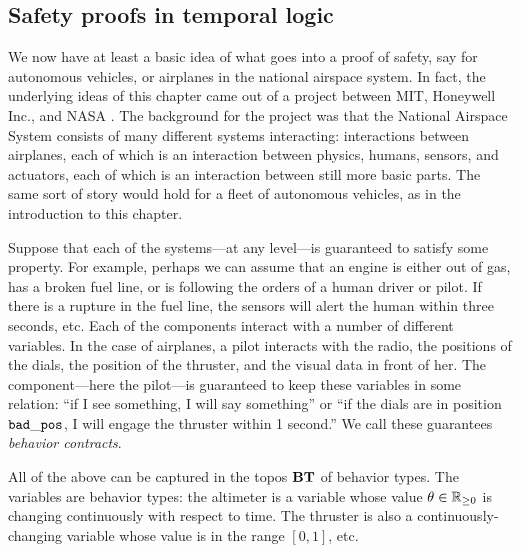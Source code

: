 \documentclass[7Sketches]{subfiles}
\begin{document}
%
%
%

%
\subsection{Safety proofs in temporal logic}%

We now have at least a basic idea of what goes into a proof of safety, say for
autonomous vehicles, or airplanes in the national airspace system. In fact, the underlying ideas of this chapter came out of a project between MIT, Honeywell Inc., and NASA \cite{speranzon2018abstraction}. The background for the project was that the National Airspace System consists of many different systems interacting: interactions between airplanes, each of which is an interaction between physics, humans, sensors, and actuators, each of which is an interaction between still more basic parts. The same sort of story would hold for a fleet of autonomous vehicles, as in the introduction to this chapter.

Suppose that each of the systems---at any level---is guaranteed to satisfy some property. For example, perhaps we can assume that an engine is either out of gas, has a broken fuel line, or is following the orders of a human driver or pilot. If there is a rupture in the fuel line, the sensors will alert
the human within three seconds, etc. Each of the components interact with a number
of different variables. In the case of airplanes, a pilot interacts with the radio, the positions of the
dials, the position of the thruster, and the visual data in front of her. The
component---here the pilot---is guaranteed to keep these variables in some
relation: ``if I see something, I will say something'' or ``if the dials are in
position $\mathtt{bad\_pos}$, I will engage the thruster within 1 second.'' We
call these guarantees \emph{behavior contracts}.%

All of the above can be captured in the topos $\mathbf{BT}$ of behavior types. The variables are behavior types: the altimeter is a variable whose value $\theta\in \mathbb{R}_{\geq0}$ is changing continuously with respect to time. The thruster is also a continuously-changing variable whose value is in the range $[0,1]$, etc.
\end{document}
